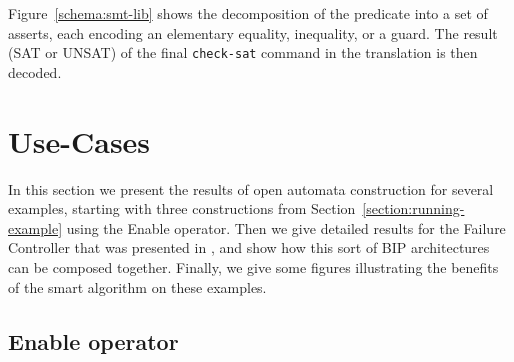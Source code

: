 \documentclass[smallcondensed]{svjour3}
\begin{document}
Figure~\ref{schema:smt-lib} shows the decomposition of the
predicate into a set of asserts, each encoding an elementary equality,
inequality, or a guard. 
The result (SAT or UNSAT) of the final \texttt{check-sat} command in
the translation is then decoded.

\section{Use-Cases}
\label{section:use-cases}
In this section we present the results of open automata construction
for several examples, starting with three constructions from
Section~\ref{section:running-example} using the Enable operator.
Then we give detailed results for the Failure Controller that was
presented in \cite{AVOCS18}, and show how this sort of BIP architectures
can be composed together.
Finally, we give some figures illustrating the benefits of the smart
algorithm on these examples.

\subsection{Enable operator} 
\label{section:use-case:Enable}
\end{document}

